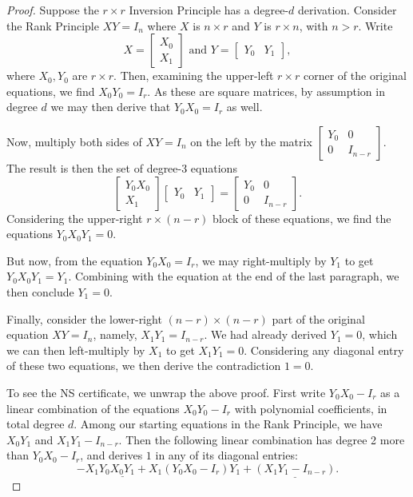 \documentclass[10pt,a4paper]{article}
\theoremstyle{definition}
\begin{document}
\begin{proof}
Suppose the $r \times r$ Inversion Principle has a degree-$d$ derivation. Consider the Rank Principle $XY=I_n$ where $X$ is $n \times r$ and $Y$ is $r \times n$, with $n > r$. Write
\[
X = \begin{bmatrix} X_0 \\ X_1 \end{bmatrix} \text{ and } Y = \begin{bmatrix} Y_0 & Y_1 \end{bmatrix},
\]
where $X_0,Y_0$ are $r \times r$. Then, examining the upper-left $r \times r$ corner of the original equations, we find $X_0 Y_0 = I_r$. As these are square matrices, by assumption in degree $d$ we may then derive that $Y_0 X_0 = I_r$ as well.

Now, multiply both sides of $XY=I_n$ on the left by the matrix $\begin{bmatrix} Y_0 & 0 \\ 0 & I_{n-r} \end{bmatrix}$. The result is then the set of degree-3 equations
\[
\begin{bmatrix} Y_0 X_0 \\ X_1 \end{bmatrix} \begin{bmatrix} Y_0 & Y_1 \end{bmatrix} = \begin{bmatrix} Y_0 & 0 \\ 0 & I_{n-r} \end{bmatrix}.
\]
Considering the upper-right $r \times (n-r)$ block of these equations, we find the equations $Y_0 X_0 Y_1 = 0$. 

But now, from the equation $Y_0 X_0 = I_r$, we may right-multiply by $Y_1$ to get $Y_0 X_0 Y_1 = Y_1$. Combining with the equation at the end of the last paragraph, we then conclude $Y_1 = 0$.

Finally, consider the lower-right $(n-r) \times (n-r)$ part of the original equation $XY = I_n$, namely, $X_1 Y_1 = I_{n-r}$. We had already derived $Y_1 = 0$, which we can then left-multiply by $X_1$ to get $X_1 Y_1 = 0$. Considering any diagonal entry of these two equations, we then derive the contradiction $1=0$.

To see the NS certificate, we unwrap the above proof. First write $Y_0 X_0 - I_r$ as a linear combination of the equations $X_0 Y_0 - I_r$ with polynomial coefficients, in total degree $d$. Among our starting equations in the Rank Principle, we have $X_0 Y_1$ and $X_1 Y_1 - I_{n-r}$. Then the following linear combination has degree 2 more than $Y_0 X_0 - I_r$, and derives $1$ in any of its diagonal entries: 
\[
-X_1 Y_0 \underline{X_0 Y_1} + X_1 (Y_0 X_0 - I_r) Y_1 + \underline{(X_1 Y_1 - I_{n-r})}.
\]
\end{proof}
\end{document}
